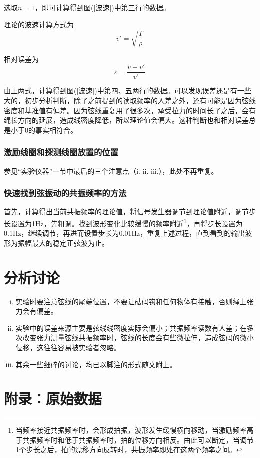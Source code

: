 \documentclass[a4paper,11pt]{article}
\begin{document}
                选取$n=1$，即可计算得到图(\ref{波速})中第三行的数据。

                理论的波速计算方式为$$v'=\sqrt{\dfrac{T}{\rho}}$$

                相对误差为$$\varepsilon =\dfrac{v-v'}{v'}$$

                由上两式，计算得到图(\ref{波速})中第四、五两行的数据。可以发现误差还是有一些大的，初步分析判断，除了之前提到的读取频率的人差之外，还有可能是因为弦线密度和基准值有偏差。因为弦线重复用了很多次，承受拉力的时间长了之后，会有绳长方向的延展，造成线密度降低，所以理论值会偏大。这种判断也和相对误差总是小于0的事实相符合。

            \subsubsection{激励线圈和探测线圈放置的位置}
                参见“实验仪器”一节中最后的三个注意点（i. ii. iii.），此处不再重复。
            \subsubsection{快速找到弦振动的共振频率的方法}
                首先，计算得出当前共振频率的理论值，将信号发生器调节到理论值附近，调节步长设置为1Hz，先粗调。找到波形变化比较缓慢的频率附近\footnote{当频率接近共振频率时，会形成拍振，波形发生缓慢横向移动，当激励频率高于共振频率时和低于共振频率时，拍的位移方向相反。由此可以断定，当调节1个步长之后，拍的漂移方向反转时，共振频率即处在这两个频率之间。}，再将步长设置为0.1Hz，继续调节，再进而设置步长为0.01Hz，重复上述过程，直到看到的输出波形为振幅最大的稳定正弦波为止。
\section{分析讨论}
    \begin{enumerate}[i.]
        \item 实验时要注意弦线的尾端位置，不要让砝码钩和任何物体有接触，否则绳上张力会有偏差。
        \item 实验中的误差来源主要是弦线线密度实际会偏小；共振频率读数有人差；在多次改变张力测量弦线共振频率时，弦线的长度会有些微拉伸，造成弦码的微小位移，这往往容易被实验者忽略。
        \item 其余一些细碎的讨论，均已以脚注的形式随文附上。
    \end{enumerate}

\section*{附录：原始数据}
\end{document}
